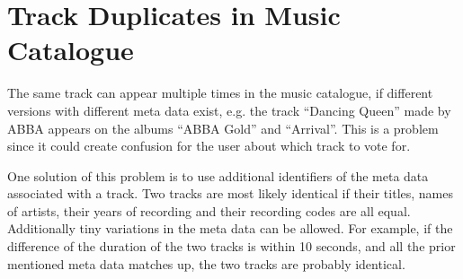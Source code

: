 \section{Track Duplicates in Music Catalogue}
\label{sec:duplicates}
The same track can appear multiple times in the music catalogue, if different versions with different meta data exist, e.g. the track \enquote{Dancing Queen} made by ABBA appears on the albums \enquote{ABBA Gold} and \enquote{Arrival}. This is a problem since it could create confusion for the user about which track to vote for.

One solution of this problem is to use additional identifiers of the
meta data associated with a track. Two tracks are most likely
identical if their titles, names of artists, their years of recording and
their recording codes are all equal. Additionally tiny variations in
the meta data can be allowed. For example, if the difference of the duration of the
two tracks is within 10 seconds, and all the prior mentioned meta data
matches up, the two tracks are probably identical.
